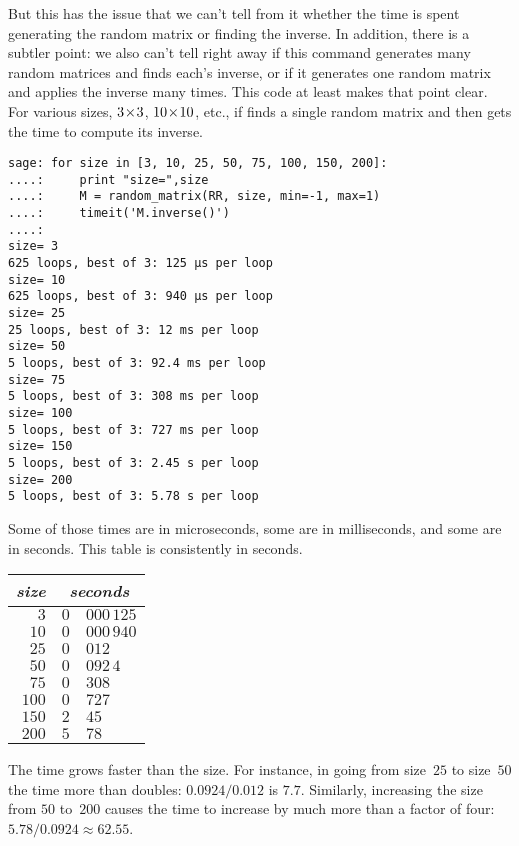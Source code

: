 But this has the issue that we can't tell from it  
whether the time is spent generating
the random matrix or finding the inverse.
In addition, there is a subtler point: we also can't tell right away if
this command generates many random matrices and finds 
each's inverse,
or if it generates one random matrix and applies the inverse many times.
This code at least makes that point clear.
For various sizes, $3 \! \times \! 3$, $10 \! \times \! 10$, etc.,
if finds a single random matrix and then 
gets the time to compute its inverse.
\begin{lstlisting}
sage: for size in [3, 10, 25, 50, 75, 100, 150, 200]:
....:     print "size=",size
....:     M = random_matrix(RR, size, min=-1, max=1)
....:     timeit('M.inverse()')
....: 
size= 3
625 loops, best of 3: 125 µs per loop
size= 10
625 loops, best of 3: 940 µs per loop
size= 25
25 loops, best of 3: 12 ms per loop
size= 50
5 loops, best of 3: 92.4 ms per loop
size= 75
5 loops, best of 3: 308 ms per loop
size= 100
5 loops, best of 3: 727 ms per loop
size= 150
5 loops, best of 3: 2.45 s per loop
size= 200
5 loops, best of 3: 5.78 s per loop
\end{lstlisting}
Some of those times are in microseconds, some are in milliseconds, and some
are in seconds.
This table is consistently in seconds.
\begin{center}
  \begin{tabular}{r|r@{.}l}
    \textit{size}     &\multicolumn{2}{c}{\textit{seconds}}  \\  \hline
    $3$      &$0$ &$000\,125$ \\
    $10$     &$0$ &$000\,940$ \\
    $25$     &$0$ &$012$ \\
    $50$     &$0$ &$092\,4$ \\
    $75$     &$0$ &$308$ \\
    $100$    &$0$ &$727$ \\
    $150$    &$2$ &$45$ \\
    $200$    &$5$ &$78$ 
  \end{tabular}
\end{center}
The time grows faster than the size.
For instance, in going from size~$25$ to size~$50$ the time more than
doubles: $0.0924/0.012$ is $7.7$.
Similarly, increasing the size from $50$ to~$200$ causes the time to 
increase by much more than a factor of four: $5.78/0.0924\approx 62.55$. 

